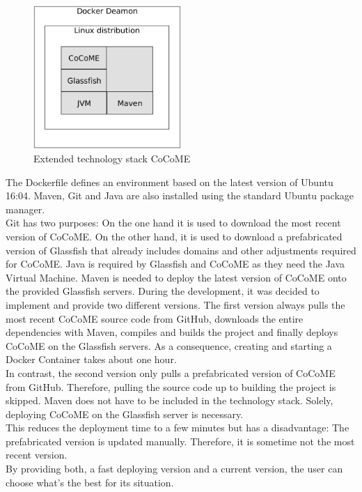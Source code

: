 	\begin{figure}[!h]
		\centering
		\includegraphics[width = 0.5\textwidth]{img/tech_stack_CoCoME.png}
		\caption{Extended technology stack CoCoME}
		\label{techStack}
	\end{figure}
\noindent	
The Dockerfile defines an environment based on the latest version of Ubuntu 16:04. Maven, Git and Java are also installed using the standard Ubuntu package manager.\\
Git has two purposes: On the one hand it is used to download the most recent version of CoCoME.	On the other hand, it is used to download a prefabricated version of Glassfish that already includes domains and other adjustments required for CoCoME. Java is required by Glassfish and CoCoME as they need the Java Virtual Machine. Maven is needed to deploy the latest version of CoCoME onto the provided Glassfish servers.
\noindent
During the development, it was decided to implement and provide two different versions. The first version always pulls the most recent CoCoME source code from GitHub, downloads the entire dependencies with Maven, compiles and builds the project and finally deploys CoCoME on the Glassfish servers. As a consequence, creating and starting a Docker Container takes about one hour.\\
In contrast, the second version only pulls a prefabricated version of CoCoME from GitHub. 
Therefore, pulling the source code up to building the project is skipped. Maven does not have to be included in the technology stack. Solely, deploying CoCoME on the Glassfish server is necessary.\\
This reduces the deployment time to a few minutes but has a disadvantage: The prefabricated version is updated manually. Therefore, it is sometime not the most recent version.\\
By providing both, a fast deploying version and a current version, the user can choose what's the best for its situation.
	

